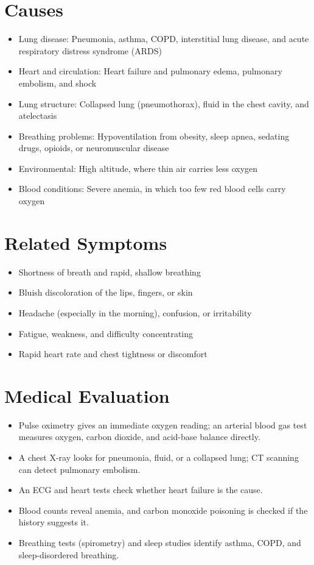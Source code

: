 \section*{Causes}
\begin{itemize}
  \item Lung disease: Pneumonia, asthma, COPD, interstitial lung disease, and acute respiratory distress syndrome (ARDS)
  \item Heart and circulation: Heart failure and pulmonary edema, pulmonary embolism, and shock
  \item Lung structure: Collapsed lung (pneumothorax), fluid in the chest cavity, and atelectasis
  \item Breathing problems: Hypoventilation from obesity, sleep apnea, sedating drugs, opioids, or neuromuscular disease
  \item Environmental: High altitude, where thin air carries less oxygen
  \item Blood conditions: Severe anemia, in which too few red blood cells carry oxygen
\end{itemize}

\section*{Related Symptoms}
\begin{itemize}
  \item Shortness of breath and rapid, shallow breathing
  \item Bluish discoloration of the lips, fingers, or skin
  \item Headache (especially in the morning), confusion, or irritability
  \item Fatigue, weakness, and difficulty concentrating
  \item Rapid heart rate and chest tightness or discomfort
\end{itemize}

\section*{Medical Evaluation}
\begin{itemize}
  \item Pulse oximetry gives an immediate oxygen reading; an arterial blood gas test measures oxygen, carbon dioxide, and acid-base balance directly.
  \item A chest X-ray looks for pneumonia, fluid, or a collapsed lung; CT scanning can detect pulmonary embolism.
  \item An ECG and heart tests check whether heart failure is the cause.
  \item Blood counts reveal anemia, and carbon monoxide poisoning is checked if the history suggests it.
  \item Breathing tests (spirometry) and sleep studies identify asthma, COPD, and sleep-disordered breathing.
\end{itemize}

